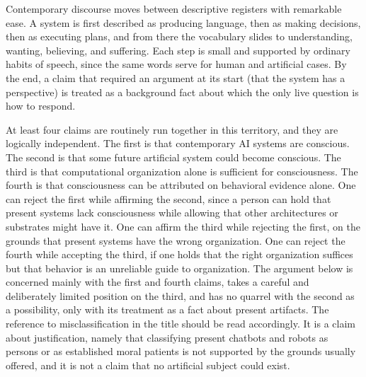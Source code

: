 \documentclass[12pt]{article}
\theoremstyle{definition}
\begin{document}
Contemporary discourse moves between descriptive registers with remarkable ease. A system is first described as producing language, then as making decisions, then as executing plans, and from there the vocabulary slides to understanding, wanting, believing, and suffering. Each step is small and supported by ordinary habits of speech, since the same words serve for human and artificial cases. By the end, a claim that required an argument at its start (that the system has a perspective) is treated as a background fact about which the only live question is how to respond.

At least four claims are routinely run together in this territory, and they are logically independent. The first is that contemporary AI systems are conscious. The second is that some future artificial system could become conscious. The third is that computational organization alone is sufficient for consciousness. The fourth is that consciousness can be attributed on behavioral evidence alone. One can reject the first while affirming the second, since a person can hold that present systems lack consciousness while allowing that other architectures or substrates might have it. One can affirm the third while rejecting the first, on the grounds that present systems have the wrong organization. One can reject the fourth while accepting the third, if one holds that the right organization suffices but that behavior is an unreliable guide to organization. The argument below is concerned mainly with the first and fourth claims, takes a careful and deliberately limited position on the third, and has no quarrel with the second as a possibility, only with its treatment as a fact about present artifacts. The reference to misclassification in the title should be read accordingly. It is a claim about justification, namely that classifying present chatbots and robots as persons or as established moral patients is not supported by the grounds usually offered, and it is not a claim that no artificial subject could exist.
\end{document}
